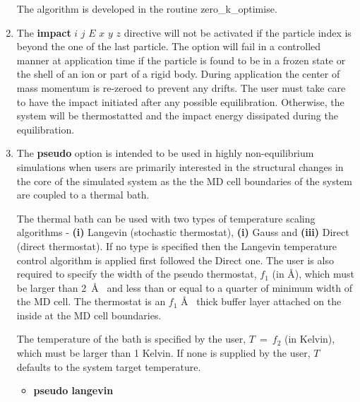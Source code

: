 \begin{enumerate}
The algorithm is developed in the \D routine {\sc zero\_k\_optimise}.

\item The {\bf impact} $i$ $j$ $E$ $x$ $y$ $z$ directive will
not be activated if the particle index is beyond the one of
the last particle.  The option will fail in a controlled manner
at application time if the particle is found to be in a frozen
state or the shell of an ion or part of a rigid body.  During
application the center of mass momentum is re-zeroed to prevent
any drifts.  The user must take care to have the impact
initiated after any possible equilibration.  Otherwise, the
system will be thermostatted and the impact energy dissipated
during the equilibration.

\item The {\bf pseudo} option is intended to be used in highly
non-equilibrium simulations when users are primarily interested in
the structural changes in the core of the simulated system as the
the MD cell boundaries of the system are coupled to a thermal bath.

The thermal bath can be used with two types of temperature scaling
algorithms - {\bf(i)} Langevin (stochastic thermostat), {\bf(i)} Gauss
and {\bf(iii)} Direct (direct thermostat).  If no type is specified then
the Langevin temperature control algorithm is applied first followed the
Direct one.  The user is also required to specify the width of the
pseudo thermostat, $f_{1}$ (in \AA), which must be larger than 2~\AA~
and less than or equal to a quarter of minimum width of the MD cell.
The thermostat is an $f_{1}$ \AA~ thick buffer layer attached on the
inside at the MD cell boundaries.

The temperature of the bath is specified by the user, $T~=~f_{2}$
(in Kelvin), which must be larger than 1 Kelvin.  If none is supplied
by the user, $T$ defaults to the system target temperature.

\begin{itemize}
\item {\bf pseudo langevin}


\end{itemize}
\end{enumerate}

